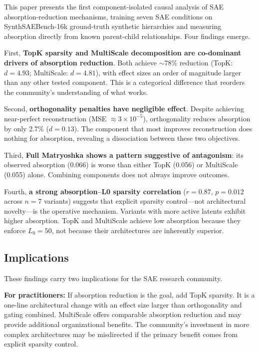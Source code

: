 \documentclass{article}
\begin{document}
This paper presents the first component-isolated causal analysis of SAE absorption-reduction mechanisms, training seven SAE conditions on SynthSAEBench-16k ground-truth synthetic hierarchies and measuring absorption directly from known parent-child relationships. Four findings emerge.

First, \textbf{TopK sparsity and MultiScale decomposition are co-dominant drivers of absorption reduction}. Both achieve $\sim$78\% reduction (TopK: $d = 4.93$; MultiScale: $d = 4.81$), with effect sizes an order of magnitude larger than any other tested component. This is a categorical difference that reorders the community's understanding of what works.

Second, \textbf{orthogonality penalties have negligible effect}. Despite achieving near-perfect reconstruction (MSE $\approx 3 \times 10^{-5}$), orthogonality reduces absorption by only 2.7\% ($d = 0.13$). The component that most improves reconstruction does nothing for absorption, revealing a dissociation between these two objectives.

Third, \textbf{Full Matryoshka shows a pattern suggestive of antagonism}: its observed absorption (0.066) is worse than either TopK (0.056) or MultiScale (0.055) alone. Combining components does not always improve outcomes.

Fourth, \textbf{a strong absorption--L0 sparsity correlation} ($r = 0.87$, $p = 0.012$ across $n = 7$ variants) suggests that explicit sparsity control---not architectural novelty---is the operative mechanism. Variants with more active latents exhibit higher absorption. TopK and MultiScale achieve low absorption because they enforce $L_0 = 50$, not because their architectures are inherently superior.

\subsection{Implications}

These findings carry two implications for the SAE research community.

\textbf{For practitioners:} If absorption reduction is the goal, add TopK sparsity. It is a one-line architectural change with an effect size larger than orthogonality and gating combined. MultiScale offers comparable absorption reduction and may provide additional organizational benefits. The community's investment in more complex architectures may be misdirected if the primary benefit comes from explicit sparsity control.
\end{document}
